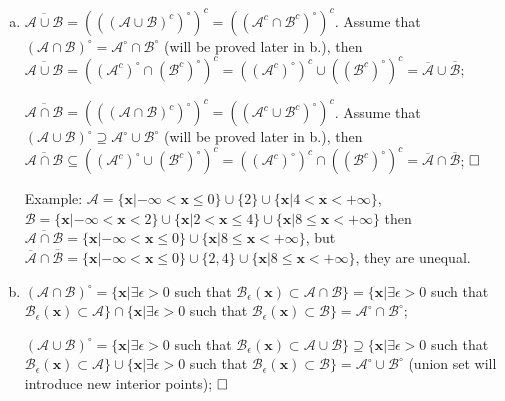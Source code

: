 \documentclass[
	12pt, %
]{fphw}
\begin{document}
\begin{enumerate}[a. ]
	\item $\overline{\mathcal{A}\cup \mathcal{B}}=(((\mathcal{A}\cup \mathcal{B})^c)^{\circ})^c=((\mathcal{A}^c\cap \mathcal{B}^c)^{\circ})^c$. Assume that $(\mathcal{A} \cap \mathcal{B})^{\circ}={\mathcal{A}}^{\circ}\cap {\mathcal{B}}^{\circ}$ (will be proved later in b.), then $\overline{\mathcal{A}\cup \mathcal{B}}=((\mathcal{A}^c)^{\circ}\cap (\mathcal{B}^c)^{\circ})^c=((\mathcal{A}^c)^{\circ})^c\cup ((\mathcal{B}^c)^{\circ})^c=\overline{\mathcal{A}}\cup \overline{\mathcal{B}}$;
	
	$\overline{\mathcal{A}\cap \mathcal{B}}=(((\mathcal{A}\cap \mathcal{B})^c)^{\circ})^c=((\mathcal{A}^c\cup \mathcal{B}^c)^{\circ})^c$. Assume that $(\mathcal{A} \cup \mathcal{B})^{\circ} \supseteq {\mathcal{A}}^{\circ}\cup {\mathcal{B}}^{\circ}$ (will be proved later in b.), then $\overline{\mathcal{A}\cap \mathcal{B}}\subseteq ((\mathcal{A}^c)^{\circ}\cup (\mathcal{B}^c)^{\circ})^c=((\mathcal{A}^c)^{\circ})^c\cap ((\mathcal{B}^c)^{\circ})^c=\overline{\mathcal{A}}\cap \overline{\mathcal{B}}$;
	$\hfill \square$
	
	Example: $\mathcal{A}=\{\mathbf{x}|-\infty< \mathbf{x} \leq 0\}\cup \{2\}\cup \{\mathbf{x}|4< \mathbf{x}< +\infty\}$, $\mathcal{B}=\{\mathbf{x}|-\infty < \mathbf{x}< 2\}\cup \{\mathbf{x}|2< \mathbf{x}\leq 4\}\cup \{\mathbf{x}|8\leq \mathbf{x}< +\infty\}$
	then $\overline{\mathcal{A}\cap \mathcal{B}}=\{\mathbf{x}|-\infty < \mathbf{x}\leq 0\}\cup \{\mathbf{x}|8\leq \mathbf{x} <+\infty \}$, but $\overline{\mathcal{A}}\cap \overline{\mathcal{B}}=\{\mathbf{x}|-\infty < \mathbf{x}\leq 0\}\cup \{2,4\}\cup \{\mathbf{x}|8\leq \mathbf{x} <+\infty \}$, they are unequal.
	
	\item $(\mathcal{A}\cap \mathcal{B})^{\circ}=\{\mathbf{x}|\exists \epsilon >0$ such that $\mathcal{B}_{\epsilon}(\mathbf{x})\subset \mathcal{A} \cap \mathcal{B}\}=\{\mathbf{x}|\exists \epsilon >0$ such that $\mathcal{B}_{\epsilon}(\mathbf{x})\subset \mathcal{A}\}\cap \{\mathbf{x}|\exists \epsilon >0$ such that $\mathcal{B}_{\epsilon}(\mathbf{x})\subset \mathcal{B}\}={\mathcal{A}}^{\circ}\cap {\mathcal{B}}^{\circ}$;
	
	$(\mathcal{A}\cup \mathcal{B})^{\circ}=\{\mathbf{x}|\exists \epsilon >0$ such that $\mathcal{B}_{\epsilon}(\mathbf{x})\subset \mathcal{A} \cup \mathcal{B}\}\supseteq \{\mathbf{x}|\exists \epsilon >0$ such that $\mathcal{B}_{\epsilon}(\mathbf{x})\subset \mathcal{A}\}\cup \{\mathbf{x}|\exists \epsilon >0$ such that $\mathcal{B}_{\epsilon}(\mathbf{x})\subset \mathcal{B}\}={\mathcal{A}}^{\circ}\cup {\mathcal{B}}^{\circ}$ (union set will introduce new interior points);
	$\hfill \square$
	

\end{enumerate}
\end{document}
